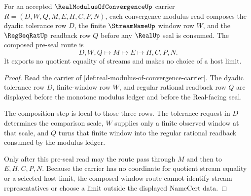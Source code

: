 \begin{theorem}
\label{thm:real-modulus-of-convergence-window-composition}
For an accepted $\RealModulusOfConvergenceUp$ carrier $R=(D,W,Q,M,E,H,C,P,N)$, each convergence-modulus read composes the dyadic tolerance row $D$, the finite $\StreamNameUp$ window row $W$, and the $\RegSeqRatUp$ readback row $Q$ before any $\RealUp$ seal is consumed. The composed pre-seal route is
$$
D,W,Q \longmapsto M \longmapsto E \longmapsto H,C,P,N .
$$
It exports no quotient equality of streams and makes no choice of a host limit.
\end{theorem}
\begin{proof}
Read the carrier of \autoref{def:real-modulus-of-convergence-carrier}. The dyadic tolerance row $D$, finite-window row $W$, and regular rational readback row $Q$ are displayed before the monotone modulus ledger and before the Real-facing seal.

The composition step is local to those three rows. The tolerance request in $D$ determines the comparison scale, $W$ supplies only a finite observed window at that scale, and $Q$ turns that finite window into the regular rational readback consumed by the modulus ledger.

Only after this pre-seal read may the route pass through $M$ and then to $E,H,C,P,N$. Because the carrier has no coordinate for quotient stream equality or a selected host limit, the composed window route cannot identify stream representatives or choose a limit outside the displayed NameCert data.
\end{proof}

